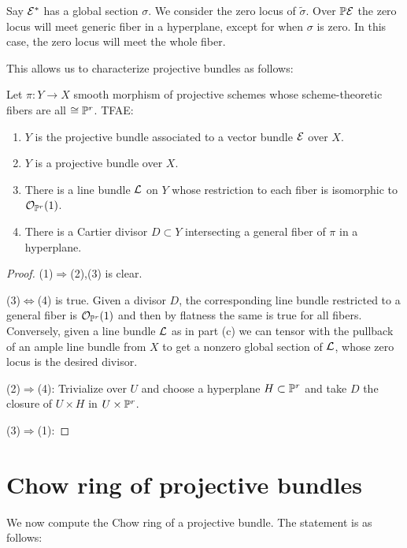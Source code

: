 \documentclass[12pt]{article}
\begin{document}
\hfill

Say $\cE^*$ has a global section $\sigma$. We consider the zero locus of $\tilde\sigma$.
Over $\P\cE$ the zero locus will meet generic fiber in a hyperplane, except for when
$\sigma$ is zero. In this case, the zero locus will meet the whole fiber.

\hfill

This allows us to characterize projective bundles as follows:

\begin{theorem}
	Let $\pi: Y\to X$ smooth morphism of projective schemes whose
	scheme-theoretic fibers are all $\cong \P^r$. TFAE:
	\begin{enumerate}
		\item $Y$ is the projective bundle associated to a vector bundle $\cE$ over $X$.
		\item $Y$ is a projective bundle over $X$.
		\item There is a line bundle $\cL$ on $Y$ whose restriction to each fiber
		      is isomorphic to $\cO_{\P^r}(1)$.
		\item There is a Cartier divisor $D\subset Y$ intersecting a general fiber
		      of $\pi$ in a hyperplane.
	\end{enumerate}
\end{theorem}

\begin{proof}
	(1)$\Rightarrow$(2),(3) is clear.

	\hfill

	(3)$\iff$(4) is true. Given a divisor $D$, the corresponding line bundle restricted to
	a general fiber is $\cO_{\P^r}(1)$ and then by flatness the same is true for all fibers.
	Conversely, given a line bundle $\cL$ as in part (c) we can tensor with the
	pullback of an ample line bundle from $X$ to get a nonzero global section of $\cL$,
	whose zero locus is the desired divisor.

	\hfill

	(2)$\Rightarrow$(4): Trivialize over $U$ and choose a hyperplane $H\subset \P^r$ and take
	$D$ the closure of $U\times H$ in $U\times \P^r$.

	\hfill

	(3)$\Rightarrow$(1):
\end{proof}

\section{Chow ring of projective bundles}
We now compute the Chow ring of a projective bundle. The statement is as follows:
\end{document}
